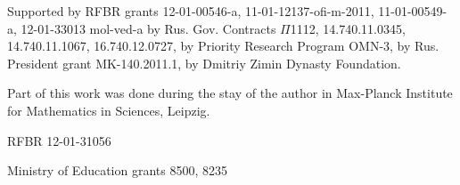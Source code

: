 Supported by RFBR grants 12-01-00546-a, 11-01-12137-ofi-m-2011, 11-01-00549-a, 12-01-33013 mol-ved-a 
by Rus. Gov. Contracts $\Pi$1112, 14.740.11.0345, 14.740.11.1067, 16.740.12.0727,
by Priority Research Program OMN-3,                                                                                                                                                                                                                         %
by Rus. President grant MK-140.2011.1, by Dmitriy Zimin Dynasty
Foundation. %

Part of this work was done during the stay of the author
in Max-Planck Institute for Mathematics in Sciences, Leipzig. %

RFBR 12-01-31056 %

Ministry of Education grants 8500, 8235 

